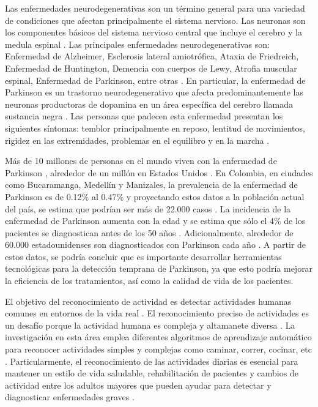 \documentclass[11pt]{report}
\begin{document}
\justify
Las enfermedades neurodegenerativas son un término general para una variedad de condiciones que afectan principalmente el sistema nervioso. Las neuronas son los componentes básicos del sistema nervioso central que incluye el cerebro y la medula espinal \cite{Neuro}. Las principales enfermedades neurodegenerativas son: Enfermedad de Alzheimer, Esclerosis lateral amiotrófica, Ataxia de Friedreich, Enfermedad de Huntington, Demencia con cuerpos de Lewy, Atrofia muscular espinal, Enfermedad de Parkinson, entre otras \cite{ParkFound}. En particular, la enfermedad de Parkinson es un trastorno neurodegenerativo que afecta predominantemente las neuronas productoras de dopamina en un área específica del cerebro llamada sustancia negra \cite{ParkFound}. Las personas que padecen esta enfermedad presentan los siguientes síntomas: temblor principalmente en reposo, lentitud de movimientos, rigidez en las extremidades, problemas en el equilibro y en la marcha \cite{ParkFound}.


\justify
\par
\medskip
\noindent
 Más de 10 millones de personas en el mundo viven con la enfermedad de Parkinson \cite{Estadistica}, alrededor de un millón en Estados Unidos \cite{Estadistica}. En Colombia, en ciudades como Bucaramanga, Medellín y Manizales, la prevalencia de la enfermedad de Parkinson es de 0.12\% al 0.47\% y proyectando estos datos a la población actual del país, se estima que podrían ser más de 22.000 casos \cite{colprensa}. La incidencia de la enfermedad de Parkinson aumenta con la edad y se estima que sólo el 4\% de los pacientes se diagnostican antes de los 50 años \cite{Estadistica}. Adicionalmente, alrededor de 60.000 estadounidenses son diagnosticados con Parkinson cada año \cite{Estadistica}. A partir de estos datos, se podría concluir que es importante desarrollar herramientas tecnológicas para la detección temprana de Parkinson, ya que esto podría mejorar la eficiencia de los tratamientos, así como la calidad de vida de los pacientes.


\justify
\par
\medskip
\noindent
El objetivo del reconocimiento de actividad es detectar actividades humanas comunes en entornos de la vida real \cite{kim2010human}. El reconocimiento preciso de actividades es un desafío porque la actividad humana es compleja y altamanete diversa \cite{kim2010human}. La investigación en esta área emplea diferentes algoritmos de aprendizaje automático para reconocer actividades simples y complejas como caminar, correr, cocinar, etc \cite{cao2018gchar}. Particularmente, el reconocimiento de las actividades diarias es esencial para mantener un estilo de vida saludable, rehabilitación de pacientes y cambios de actividad entre los adultos mayores que pueden ayudar para detectar y diagnosticar enfermedades graves \cite{cao2018gchar}.
\end{document}
